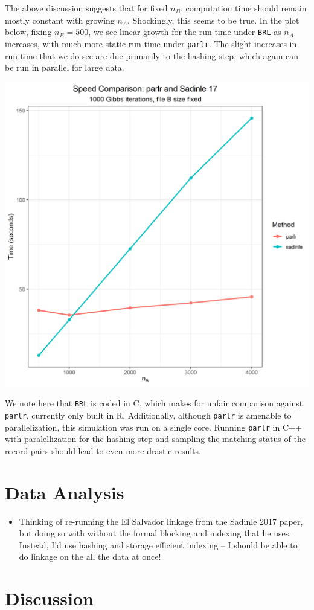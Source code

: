 \documentclass[
  12pt,
]{article}
\providecommand{\tightlist}{%
  \setlength{\itemsep}{0pt}\setlength{\parskip}{0pt}}
\begin{document}
The above discussion suggests that for fixed \(n_B\), computation time
should remain mostly constant with growing \(n_A\). Shockingly, this
seems to be true. In the plot below, fixing \(n_B = 500\), we see linear
growth for the run-time under \texttt{BRL} as \(n_A\) increases, with
much more static run-time under \texttt{parlr}. The slight increases in
run-time that we do see are due primarily to the hashing step, which
again can be run in parallel for large data.

\begin{center}\includegraphics[width=29.17in]{../notes/figures/speed_plot_fixed_nB} \end{center}

We note here that \texttt{BRL} is coded in C, which makes for unfair
comparison against \texttt{parlr}, currently only built in R.
Additionally, although \texttt{parlr} is amenable to parallelization,
this simulation was run on a single core. Running \texttt{parlr} in C++
with paralellization for the hashing step and sampling the matching
status of the record pairs should lead to even more drastic results.

\hypertarget{data-analysis}{%
\section{Data Analysis}\label{data-analysis}}

\begin{itemize}
\tightlist
\item
  Thinking of re-running the El Salvador linkage from the Sadinle 2017
  paper, but doing so with without the formal blocking and indexing that
  he uses. Instead, I'd use hashing and storage efficient indexing -- I
  should be able to do linkage on the all the data at once!
\end{itemize}

\hypertarget{discussion}{%
\section{Discussion}\label{discussion}}
\end{document}
